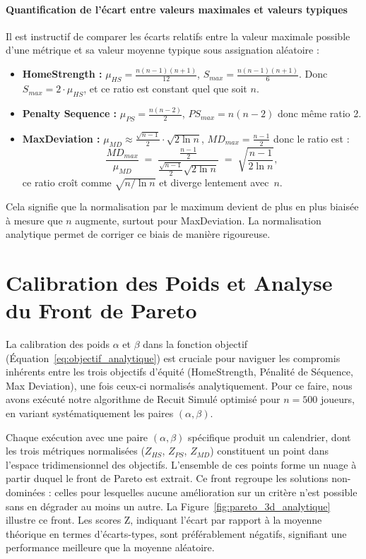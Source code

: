\documentclass[11pt, a4paper]{article}
\begin{document}
\paragraph{Quantification de l’écart entre valeurs maximales et valeurs typiques}

Il est instructif de comparer les écarts relatifs entre la valeur maximale possible d’une métrique et sa valeur moyenne typique sous assignation aléatoire :

\begin{itemize}
    \item \textbf{HomeStrength :} $\mu_{HS} = \frac{n(n-1)(n+1)}{12}$, $S_{max} = \frac{n(n-1)(n+1)}{6}$. Donc $S_{max} = 2 \cdot \mu_{HS}$, et ce ratio est constant quel que soit $n$.
    \item \textbf{Penalty Sequence :} $\mu_{PS} = \frac{n(n-2)}{2}$, $PS_{max} = n(n-2)$ donc même ratio 2.
    \item \textbf{MaxDeviation :} $\mu_{MD} \approx \frac{\sqrt{n-1}}{2} \cdot \sqrt{2 \ln n}$, $MD_{max} = \frac{n-1}{2}$ donc le ratio est :
   \[
    \frac{MD_{max}}{\mu_{MD}}
    \;=\;
    \frac{\tfrac{n-1}{2}}{\tfrac{\sqrt{n-1}}{2}\sqrt{2\ln n}}
    \;=\;
    \sqrt{\frac{n-1}{2\ln n}},
\]
ce ratio croît comme $\sqrt{n/\ln n}$ et diverge lentement avec $n$.
\end{itemize}

Cela signifie que la normalisation par le maximum devient de plus en plus biaisée à mesure que $n$ augmente, surtout pour MaxDeviation. La normalisation analytique permet de corriger ce biais de manière rigoureuse.

\section{Calibration des Poids et Analyse du Front de Pareto}
\label{sec:calibration_pareto_analytique}

La calibration des poids $\alpha$ et $\beta$ dans la fonction objectif (Équation~\ref{eq:objectif_analytique}) est cruciale pour naviguer les compromis inhérents entre les trois objectifs d'équité (HomeStrength, Pénalité de Séquence, Max Deviation), une fois ceux-ci normalisés analytiquement. Pour ce faire, nous avons exécuté notre algorithme de Recuit Simulé optimisé pour $n=500$ joueurs, en variant systématiquement les paires $(\alpha, \beta)$.

Chaque exécution avec une paire $(\alpha, \beta)$ spécifique produit un calendrier, dont les trois métriques normalisées ($Z_{HS}$, $Z_{PS}$, $Z_{MD}$) constituent un point dans l'espace tridimensionnel des objectifs. L'ensemble de ces points forme un nuage à partir duquel le front de Pareto est extrait. Ce front regroupe les solutions non-dominées : celles pour lesquelles aucune amélioration sur un critère n'est possible sans en dégrader au moins un autre. La Figure~\ref{fig:pareto_3d_analytique} illustre ce front. Les scores Z, indiquant l'écart par rapport à la moyenne théorique en termes d'écarts-types, sont préférablement négatifs, signifiant une performance meilleure que la moyenne aléatoire.
\end{document}
